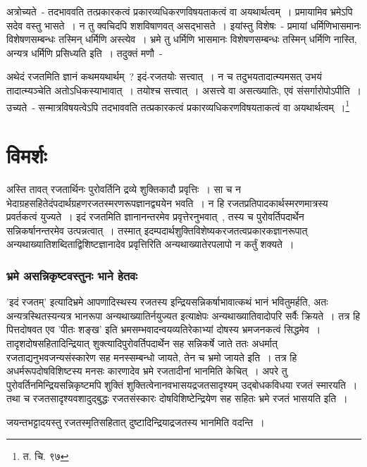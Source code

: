 		अत्रोच्यते~- तदभाववति तत्प्रकारकत्वं प्रकारव्यधिकरणविषयताकत्वं वा अयथार्थत्वम्~। प्रमायामिव भ्रमेऽपि सदेव वस्तु भासते~। न तु क्वचिदपि शशविषाणवत् असद्भासते~। इयांस्तु विशेषः~- प्रमायां धर्मिणिभासमानः विशेषणसम्बन्धः तस्मिन् धर्मिणि अस्त्येव~। भ्रमे तु धर्मिणि भासमानः विशेषणसम्बन्धः तस्मिन् धर्मिणि नास्ति, अन्यत्र धर्मिणि प्रसिध्यति इति~। तदुक्तं मणौ~-

		{\fontsize{11.7}{0}\selectfont\s अथेदं रजतमिति ज्ञानं कथमयथार्थम्~? इदं-रजतयोः सत्त्वात्~। न च तदुभयतादात्म्यमसत् उभयं तादात्म्यञ्चेति अतोऽधिकस्याभावात्~। तयोश्च सत्त्वात्~। असत्त्वे वा असत्ख्यातिः, एवं संसर्गारोपोऽपीति~। उच्यते~- सन्मात्रविषयत्वेऽपि तदभाववति तत्प्रकारकत्वं प्रकारव्यधिकरणविषयताकत्वं वा अयथार्थत्वम्~।\footnote{त. चि. ९७}}

	\section{विमर्शः}

	अस्ति तावत् रजतार्थिनः पुरोवर्तिनि द्रव्ये शुक्तिकादौ प्रवृत्तिः~। सा च न भेदाग्रहसहितेदंपदार्थग्रहणरजतस्मरणरूपज्ञानद्व्ययेन भवति~। न हि रजतप्रतिपादकार्थस्मरणमात्रस्य प्रवर्तकत्वं युज्यते~। इदं रजतमिति ज्ञानानन्तरमेव प्रवृत्तेरनुभवात्~, तस्य च पुरोवर्तिपदार्थेन सन्निकर्षानन्तरमेव उत्पन्नत्वात्~। तस्मात् इदम्पदार्थशुक्तिविशेष्यकरजतत्वप्रकारकज्ञानरूपात् अन्यथाख्यातिशब्दिताद्विशिष्टज्ञानादेव प्रवृत्तिरिति अन्यथाख्यातेरपलापो न कर्तुं शक्यते~।

		\subsubsection{भ्रमे असन्निकृष्टवस्तुनः भाने हेतवः}

		'इदं रजतम्' इत्यादिभ्रमे आपणादिस्थस्य रजतस्य इन्द्रियसन्निकर्षाभावात्कथं भानं भवितुमर्हति, अतः अन्यत्रस्थितस्यन्यत्र भानरूपा अन्यथाख्यातिर्नयुज्यत इत्याक्षेपः अन्यथाख्यातिवादोपरि सर्वैः क्रियते~। तत्र हि पित्तदोषवत एव 'पीतः शङ्ख' इति भ्रमसम्भवादन्वयव्यतिरेकाभ्यां दोषस्य भ्रमजनकत्वं सिद्धमेव~। तादृशदोषसहितादिन्द्रियात् शुक्त्यादिपुरोवर्तिपदार्थेन सह सन्निकर्षे जाते ततः अधर्मात् रजताद्यनुभवजन्यसंस्कारेण सह मनस्सम्बन्धो जायते, तेन च भ्रमो जायते इति~। तत्र हि अधर्मरूपदोषविशिष्टस्य मनसः कारणादेव भ्रमे रजतादीनां भानमिति केचित्~। अपरे तु पुरोवर्तिनमिन्द्रियसन्निकृष्टमपि शुक्तिं शुक्तित्वेनानवभासयद्रजतसादृश्यम् उद्बोधकविधया रजतं स्मारयति~। तथा च रजतसादृश्यवशादुद्बुद्धः रजतसंस्कारः दोषविशिष्टेन्द्रियेण सह सहितः भ्रमे रजतं भासयति इति~।  

		जयन्तभट्टादयस्तु रजतस्मृतिसहितात् दुष्टादिन्द्रियाद्रजतस्य भानमिति वदन्ति~।

